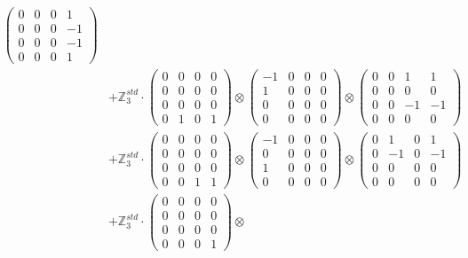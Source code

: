 \documentclass{article}
\begin{document}
{\begin{align}
            \begin{pmatrix} 0 & 0 & 0 & 1 \\ 0 & 0 & 0 & -1 \\ 0 & 0 & 0 & -1 \\ 0 & 0 & 0 & 1 \end{pmatrix} \\ 
        &+ \label{Rs1-Rc16-Strassen-1-c7} \mathbb{Z}_3^{std} \cdot 
            \begin{pmatrix} 0 & 0 & 0 & 0 \\ 0 & 0 & 0 & 0 \\ 0 & 0 & 0 & 0 \\ 0 & 1 & 0 & 1 \end{pmatrix} \otimes 
            \begin{pmatrix} -1 & 0 & 0 & 0 \\ 1 & 0 & 0 & 0 \\ 0 & 0 & 0 & 0 \\ 0 & 0 & 0 & 0 \end{pmatrix} \otimes 
            \begin{pmatrix} 0 & 0 & 1 & 1 \\ 0 & 0 & 0 & 0 \\ 0 & 0 & -1 & -1 \\ 0 & 0 & 0 & 0 \end{pmatrix} \\ 
        &+ \label{Rs1-Rc16-Strassen-1-c8} \mathbb{Z}_3^{std} \cdot 
            \begin{pmatrix} 0 & 0 & 0 & 0 \\ 0 & 0 & 0 & 0 \\ 0 & 0 & 0 & 0 \\ 0 & 0 & 1 & 1 \end{pmatrix} \otimes 
            \begin{pmatrix} -1 & 0 & 0 & 0 \\ 0 & 0 & 0 & 0 \\ 1 & 0 & 0 & 0 \\ 0 & 0 & 0 & 0 \end{pmatrix} \otimes 
            \begin{pmatrix} 0 & 1 & 0 & 1 \\ 0 & -1 & 0 & -1 \\ 0 & 0 & 0 & 0 \\ 0 & 0 & 0 & 0 \end{pmatrix} \\ 
        &+ \label{Rs1-Rc16-Strassen-1-c9} \mathbb{Z}_3^{std} \cdot 
            \begin{pmatrix} 0 & 0 & 0 & 0 \\ 0 & 0 & 0 & 0 \\ 0 & 0 & 0 & 0 \\ 0 & 0 & 0 & 1 \end{pmatrix} \otimes 

\end{align}}
\end{document}
